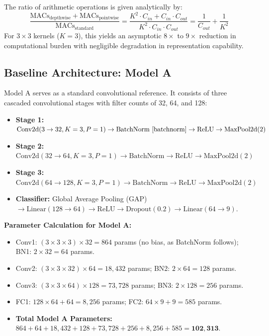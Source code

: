 \documentclass[11pt,a4paper]{article}
\begin{document}
The ratio of arithmetic operations is given analytically by:
\begin{equation}
  \frac{\text{MACs}_{\text{depthwise}} + \text{MACs}_{\text{pointwise}}}{\text{MACs}_{\text{standard}}} = \frac{K^2 \cdot C_{in} + C_{in} \cdot C_{out}}{K^2 \cdot C_{in} \cdot C_{out}} = \frac{1}{C_{out}} + \frac{1}{K^2}
\end{equation}
For $3 \times 3$ kernels ($K=3$), this yields an asymptotic $8 \times$ to $9 \times$ reduction in computational burden with negligible degradation in representation capability.

\subsection{Baseline Architecture: Model A}
Model A serves as a standard convolutional reference. It consists of three cascaded convolutional stages with filter counts of 32, 64, and 128:
\begin{itemize}[leftmargin=*,itemsep=1pt]
  \item \textbf{Stage 1:} $\text{Conv2d}(3 \to 32, K=3, P=1) \to \text{BatchNorm}~\cite{batchnorm} \to \text{ReLU} \to \text{MaxPool2d}(2)$
  \item \textbf{Stage 2:} $\text{Conv2d}(32 \to 64, K=3, P=1) \to \text{BatchNorm} \to \text{ReLU} \to \text{MaxPool2d}(2)$
  \item \textbf{Stage 3:} $\text{Conv2d}(64 \to 128, K=3, P=1) \to \text{BatchNorm} \to \text{ReLU} \to \text{MaxPool2d}(2)$
  \item \textbf{Classifier:} Global Average Pooling (GAP) $\to \text{Linear}(128 \to 64) \to \text{ReLU} \to \text{Dropout}(0.2) \to \text{Linear}(64 \to 9)$.
\end{itemize}

\textbf{Parameter Calculation for Model A:}
\begin{itemize}[leftmargin=*,itemsep=1pt]
  \item Conv1: $(3 \times 3 \times 3) \times 32 = 864$ params (no bias, as BatchNorm follows); BN1: $2 \times 32 = 64$ params.
  \item Conv2: $(3 \times 3 \times 32) \times 64 = 18,432$ params; BN2: $2 \times 64 = 128$ params.
  \item Conv3: $(3 \times 3 \times 64) \times 128 = 73,728$ params; BN3: $2 \times 128 = 256$ params.
  \item FC1: $128 \times 64 + 64 = 8,256$ params; FC2: $64 \times 9 + 9 = 585$ params.
  \item \textbf{Total Model A Parameters:} $864 + 64 + 18,432 + 128 + 73,728 + 256 + 8,256 + 585 = \mathbf{102,313}$.
\end{itemize}
\end{document}
